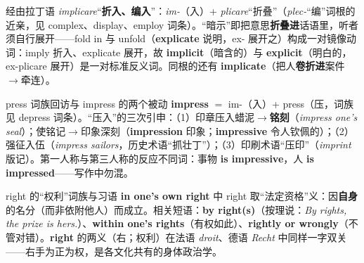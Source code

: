 \documentclass[../main.tex]{subfiles}
\begin{document}
\begin{origin}
经由拉丁语 \textit{implicare}“\textbf{折入、编入}”：\textit{im-}（入）+ \textit{plicare}“折叠”（\textit{plec-}“编”词根的近亲，见 complex、display、employ 词条）。“暗示”即把意思\textbf{折叠进}话语里，听者须自行展开——fold in 与 unfold（\textbf{explicate} 说明，ex- 展开之）构成一对镜像动词：imply 折入、explicate 展开，故 \textbf{implicit}（暗含的）与 \textbf{explicit}（明白的，ex-plicare 展开）是一对标准反义词。同根的还有 \textbf{implicate}（把人\textbf{卷折进}案件$\to$牵连）。
\end{origin}




\begin{gram}{press 词族回访与 impress 的两个被动}
\textbf{impress} $=$ im-（入）+ press（压，词族见 depress 词条）。“压入”的三次引申：（1）印章压入蜡泥$\to$\textbf{铭刻}（\textit{impress one's seal}）；使铭记$\to$印象深刻（\textbf{impression} 印象；\textbf{impressive} 令人钦佩的）；（2）强征入伍（\textit{impress sailors}，历史术语“抓壮丁”）；（3）印刷术语“压印”（\textit{imprint} 版记）。第一人称与第三人称的反应不同词：事物 \textbf{is impressive}，人 \textbf{is impressed}——写作中勿混。
\end{gram}



\begin{gram}{right 的“权利”词族与习语}
\textbf{in one's own right} 中 right 取“法定资格”义：因\textbf{自身}的名分（而非依附他人）而成立。相关短语：\textbf{by right(s)}（按理说：\textit{By rights, the prize is hers.}）、\textbf{within one's rights}（有权如此）、\textbf{rightly or wrongly}（不管对错）。\textbf{right} 的两义（右；权利）在法语 \textit{droit}、德语 \textit{Recht} 中同样一字双关——右手为正为权，是各文化共有的身体政治学。
\end{gram}
\end{document}
